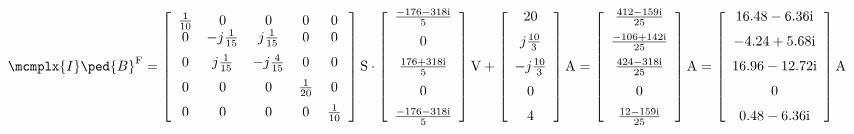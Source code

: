 \begin{exemple}
    {\fontsize{10pt}{10pt}\selectfont
    \[
    \mcmplx{I}\ped{B}^{\text{F}} =
     \begin{bmatrix}\begin{array}{ccccc}
        \frac{1}{10} & 0 & 0 & 0 & 0 \\
        0 & -j\frac{1}{15} & j\frac{1}{15} & 0 & 0 \\[2mm]
        0 & j\frac{1}{15} & -j\frac{4}{15} & 0 & 0 \\[2mm]
        0 & 0 & 0 & \frac{1}{20} & 0 \\[2mm]
        0 & 0 & 0 & 0 & \frac{1}{10}
     \end{array}\end{bmatrix}\unit{S} \cdot
     \begin{bmatrix}\begin{array}{c}
        \frac{\complexnum{-176 - j 318}}{5} \\[2mm]
        0  \\[2mm]
        \frac{\complexnum{176 + j 318}}{5} \\[2mm]
        0  \\[2mm]
        \frac{\complexnum{ -176 - j 318}}{5}
	\end{array}\end{bmatrix}\unit{V}  +
     \begin{bmatrix}\begin{array}{c}
        20 \\[2mm]
         j \frac{10}{3} \\[2mm]
         -j \frac{10}{3} \\[2mm]
         0 \\[2mm]
        4
     \end{array}\end{bmatrix}\unit{A} =
     \begin{bmatrix}\begin{array}{c}
        \frac{\complexnum{ 412 - j 159}}{25} \\[2mm]
        \frac{\complexnum{-106 + j 142}}{25}  \\[2mm]
        \frac{\complexnum{424 - j 318}}{25} \\[2mm]
        0  \\[2mm]
        \frac{\complexnum{12 - j 159}}{25}
	\end{array}\end{bmatrix}\unit{A} =
	\begin{bmatrix}\begin{array}{c}
		\complexnum{ 16,48 - j 6,36} \\[2mm]
		\complexnum{-4,24 + j 5,68}  \\[2mm]
		\complexnum{16,96 - j 12,72} \\[2mm]
			0  \\[2mm]
		\complexnum{0,48 - j 6,36}
	\end{array}\end{bmatrix}\unit{A}
	\] }

\end{exemple}
